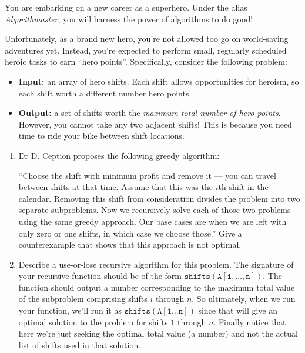 \documentclass[12 pt, letterpaper]{hmcpset}
\begin{document}
\begin{problem}
	You are embarking on a new career as a superhero. Under the alias \emph {Algorithmaster}, you will harness the power of algorithms to do good!

	Unfortunately, as a brand new hero, you're not allowed too go on world-saving adventures yet. Instead, you're expected to perform small, regularly scheduled heroic tasks to earn ``hero points''. Specifically, consider the following problem:
	\begin{itemize}
		\item \textbf{Input:} an array of hero shifts. Each shift allows opportunities for heroism, so each shift worth a different number hero points.

		\item \textbf{Output:} a set of shifts worth the \emph{maximum total number of hero points}. However, you cannot take any two adjacent shifts! This is because you need time to ride your bike between shift locations.
	\end{itemize}

	\begin{enumerate}[label = \arabic*.]
		\item Dr D. Ception proposes the following greedy algorithm: 

			``Choose the shift with minimum profit and remove it --- you can travel between shifts at that time. Assume that this was the $i$th shift in the calendar. Removing this shift from  consideration divides the problem into two separate subproblems. Now we recursively solve each of those two problems using the same greedy approach. Our base cases are when we are left with only zero or one shifts, in which case we choose those.'' Give a counterexample that shows that this approach is not optimal.

		\item Describe a use-or-lose recursive algorithm for this problem. The signature of your recursive function should be of the form $\mathtt{shifts}(\mathtt{A[i, \dots, n]})$. The function should output a number corresponding to the maximum total value of the subproblem comprising shifts $i$ through $n$. So ultimately, when we run your function, we'll run it as $\mathtt{shifts}(\mathtt{A[1 \dots n]})$ since that will give an optimal solution to the problem for shifts $1$ through $n$. Finally notice that here we're just seeking the optimal total value (a number) and not the actual list of shifts used in that solution.


\end{enumerate}
\end{problem}
\end{document}
